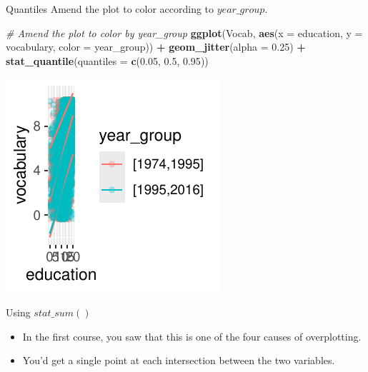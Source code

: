 \documentclass[
  ignorenonframetext,
]{beamer}
\newenvironment{Shaded}{\begin{snugshade}}{\end{snugshade}}
\newcommand{\AttributeTok}[1]{\textcolor[rgb]{0.13,0.29,0.53}{#1}}
\newcommand{\CommentTok}[1]{\textcolor[rgb]{0.56,0.35,0.01}{\textit{#1}}}
\newcommand{\FloatTok}[1]{\textcolor[rgb]{0.00,0.00,0.81}{#1}}
\newcommand{\FunctionTok}[1]{\textcolor[rgb]{0.13,0.29,0.53}{\textbf{#1}}}
\newcommand{\NormalTok}[1]{#1}
\newcommand{\SpecialCharTok}[1]{\textcolor[rgb]{0.81,0.36,0.00}{\textbf{#1}}}
\begin{document}
\begin{frame}[fragile]{Quantiles}
\label{quantiles-4}
Amend the plot to color according to \(year\_group\).


\begin{Shaded}
\begin{Highlighting}[]
\CommentTok{\# Amend the plot to color by year\_group}
\FunctionTok{ggplot}\NormalTok{(Vocab, }\FunctionTok{aes}\NormalTok{(}\AttributeTok{x =}\NormalTok{ education, }\AttributeTok{y =}\NormalTok{ vocabulary, }\AttributeTok{color =}\NormalTok{ year\_group)) }\SpecialCharTok{+}
    \FunctionTok{geom\_jitter}\NormalTok{(}\AttributeTok{alpha =} \FloatTok{0.25}\NormalTok{) }\SpecialCharTok{+} \FunctionTok{stat\_quantile}\NormalTok{(}\AttributeTok{quantiles =} \FunctionTok{c}\NormalTok{(}\FloatTok{0.05}\NormalTok{,}
    \FloatTok{0.5}\NormalTok{, }\FloatTok{0.95}\NormalTok{))}
\end{Highlighting}
\end{Shaded}

\begin{center}\includegraphics[width=0.5\linewidth]{Figs/unnamed-chunk-19-1} \end{center}
\end{frame}

\begin{frame}{Using \(stat\_sum()\)}
\label{using-stat_sum}
\begin{itemize}
\item
  In the first course, you saw that this is one of the four causes of
  overplotting.
\item
  You'd get a single point at each intersection between the two
  variables.
\end{itemize}
\end{frame}
\end{document}
